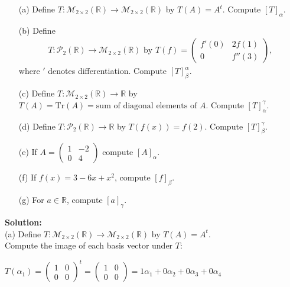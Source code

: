 \documentclass{article}
\begin{document}
\begin{itemize}
    \item[(a)] Define $T : \mathcal{M}_{2\times2}(\mathbb{R}) \to \mathcal{M}_{2\times2}(\mathbb{R})$ by $T(A) = A^t$. Compute $[T]_{\alpha}$.

    \item[(b)] Define 
    \begin{align*}
    T : \mathcal{P}_2(\mathbb{R}) \to \mathcal{M}_{2\times2}(\mathbb{R}) \text{ by } T(f) = \left(\begin{matrix} f'(0) & 2f(1) \\ 0 & f''(3) \end{matrix}\right),
    \end{align*}
    where $'$ denotes differentiation. Compute $[T]_{\beta}^{\alpha}$.

    \item[(c)] Define $T : \mathcal{M}_{2\times2}(\mathbb{R}) \to \mathbb{R}$ by $T(A) = \text{Tr}(A) = \text{sum of diagonal elements of }A$. Compute $[T]_{\alpha}^{\gamma}$.

    \item[(d)] Define $T : \mathcal{P}_2(\mathbb{R}) \to \mathbb{R}$ by $T(f(x)) = f(2)$. Compute $[T]_{\beta}^{\gamma}$.

    \item[(e)] If $A = \left(\begin{matrix} 1 & -2 \\ 0 & 4 \end{matrix}\right)$ compute $[A]_{\alpha}$.

    \item[(f)] If $f(x) = 3 - 6x + x^2$, compute $[f]_{\beta}$.

    \item[(g)] For $a \in \mathbb{R}$, compute $[a]_{\gamma}$.
\end{itemize}

\textbf{Solution: }\\

(a) Define $T : \mathcal{M}_{2\times2}(\mathbb{R}) \to \mathcal{M}_{2\times2}(\mathbb{R})$ by $T(A) = A^t$. \\

Compute the image of each basis vector under $T$:

$T(\alpha_1) = \begin{pmatrix} 1 & 0 \\ 0 & 0 \end{pmatrix}^t = \begin{pmatrix} 1 & 0 \\ 0 & 0 \end{pmatrix} = 1\alpha_1 + 0\alpha_2 + 0\alpha_3 + 0\alpha_4$
\end{document}

